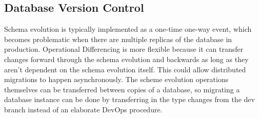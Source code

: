 \documentclass[english,submission]{programming}
\theoremstyle{definition}
\newtheorem*{remark}{Remark}
\begin{document}


\subsection{Database Version Control}\label{db-vc}

Schema evolution is typically implemented as a one-time one-way event, which becomes problematic when there are multiple replicas of the database in production. Operational Differencing is more flexible because it can transfer changes forward through the schema evolution and backwards as long as they aren't dependent on the schema evolution itself. This could allow distributed migrations to happen asynchronously.
The scheme evolution operations themselves can be transferred between copies of a database, so migrating a database instance can be done by transferring in the type changes from the dev branch instead of an elaborate DevOps procedure.
\end{document}
